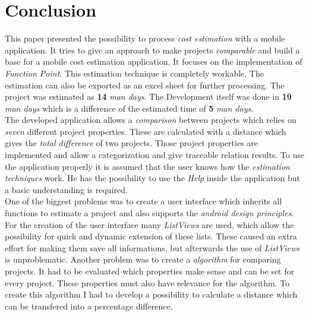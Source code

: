 \chapter{Conclusion}\label{conclusion}

This paper presented the possibility to process \textit{cost estimation} with a mobile application. It tries to give an approach to make projects \textit{comparable} and build a base for a mobile cost estimation application. It focuses on the implementation of \textit{Function Point}. This estimation technique is completely workable. The estimation can also be exported as an excel sheet for further processing. The project was estimated as \textbf{14} \textit{man days}. The Development itself was done in \textbf{19} \textit{man days} which is a difference of the estimated time of \textbf{5} \textit{man days}.\\
The developed application allows a \textit{comparison} between projects which relies on \textit{seven} different project properties. These are calculated with a distance which gives the \textit{total difference} of two projects. Those project properties are implemented and allow a categorization and give traceable relation results. To use the application properly it is assumed that the user knows how the \textit{estimation techniques} work. He has the possibility to use the \textit{Help} inside the application but a basic understanding is required.\\
One of the biggest problems was to create a user interface which inherits all functions to estimate a project and also supports the \textit{android design principles}. For the creation of the user interface many \textit{ListViews} are used, which allow the possibility for quick and dynamic extension of these lists. These caused an extra effort for making them save all informations, but afterwards the use of \textit{ListViews} is unproblematic. Another problem was to create a \textit{algorithm} for comparing projects. It had to be evaluated which properties make sense and can be set for every project. These properties must also have relevance for the algorithm. To create this algorithm I had to develop a possibility to calculate a distance which can be transfered into a percentage difference. \\
